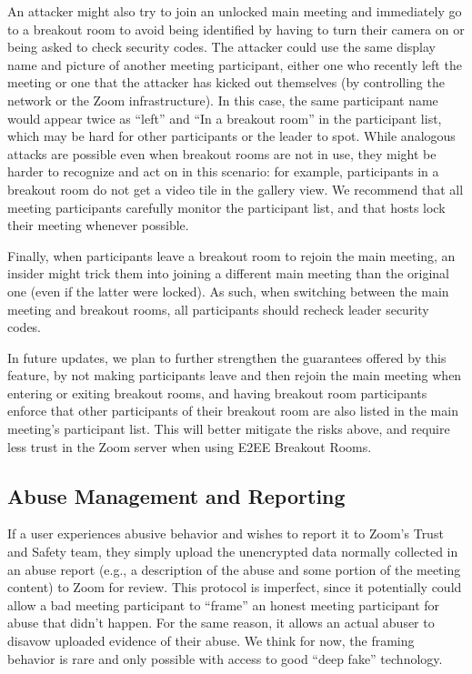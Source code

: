 An attacker might also try to join an unlocked main meeting and immediately go to a breakout room to
avoid being identified by having to turn their camera on or being asked to check security codes. The
attacker could use the same display name and picture of another meeting participant, either one who
recently left the meeting or one that the attacker has kicked out themselves (by controlling the
network or the Zoom infrastructure). In this case, the same participant name would appear twice as
``left'' and ``In a breakout room'' in the participant list, which may be hard for other
participants or the leader to spot. While analogous attacks are possible even when breakout rooms
are not in use, they might be harder to recognize and act on in this scenario: for example,
participants in a breakout room do not get a video tile in the gallery view. We recommend that all
meeting participants carefully monitor the participant list, and that hosts lock their meeting
whenever possible.

Finally, when participants leave a breakout room to rejoin the main meeting, an insider might trick
them into joining a different main meeting than the original one (even if the latter were locked).
As such, when switching between the main meeting and breakout rooms, all participants should recheck
leader security codes.

In future updates, we plan to further strengthen the guarantees offered by this feature, by not
making participants leave and then rejoin the main meeting when entering or exiting breakout rooms,
and having breakout room participants enforce that other participants of their breakout room are
also listed in the main meeting's participant list. This will better mitigate the risks above, and
require less trust in the Zoom server when using E2EE Breakout Rooms.

\subsection{Abuse Management and Reporting}
If a user experiences abusive behavior and wishes to report it to Zoom's Trust and Safety team, they
simply upload the unencrypted data normally collected in an abuse report (e.g., a description of the
abuse and some portion of the meeting content) to Zoom for review. This protocol is imperfect, since
it potentially could allow a bad meeting participant to ``frame'' an honest meeting participant for
abuse that didn't happen. For the same reason, it allows an actual abuser to disavow uploaded
evidence of their abuse. We think for now, the framing behavior is rare and only possible with
access to good ``deep fake'' technology.

